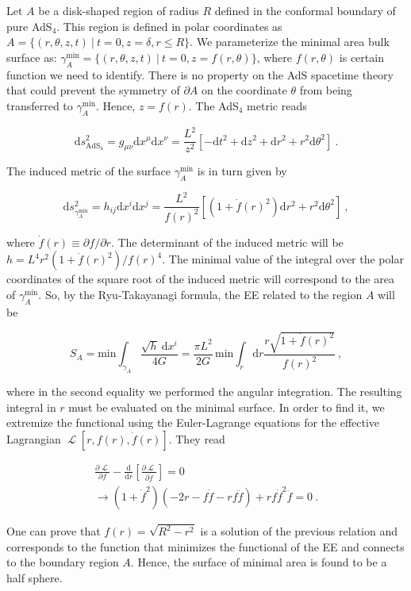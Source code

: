 \documentclass[twocolumn]{revtex4}
\providecommand{\eq}[2]{
    \begin{equation}
        #2
    \label{eq:#1}
    \end{equation}
}
\providecommand{\eqgat}[2]{
    \begin{gather}
        #2
    \label{eq:#1}
    \end{gather}
}
\DeclareMathOperator{\calL}{\mathcal{L}}
\begin{document}
Let $A$ be a disk-shaped region of radius $R$ defined in the conformal boundary of pure AdS$_4$. This region is defined in polar coordinates as
$
    A = \{ ( r, \theta, z, t ) \ | \ t = 0, z = \delta, r \le R \} 
$. 
We parameterize the minimal area bulk surface as:
$
    \gamma_A^\text{min} = \{ ( r, \theta, z, t ) \ | \ t = 0, z = f (r, \theta) \} %
$, 
where $f(r,\theta)$ is certain function we need to identify. There is no property on the AdS spacetime theory that could prevent the symmetry of $\partial A$ on the coordinate $\theta$ from being transferred to $\gamma_A^\text{min}$. Hence, $z=f(r)$.
The AdS$_4$ metric reads
\eq{1Ametric}{
    \mathrm{d}s^2_{\text{AdS}_4} = g_{\mu \nu} \mathrm{d}x^\mu \mathrm{d}x^\nu = 
    \frac{L^2}{z^2} [ -\mathrm{d}t^2 + \mathrm{d}z^2 + \mathrm{d}r^2 + r^2 \mathrm{d}\theta^2 ] \ . \nonumber
}
The induced metric of the surface $\gamma_A^\text{min}$ is in turn given by
\eq{1gammaAmetric}{
    \mathrm{d}s^2_{\gamma_A^\text{min}} = h_{i j} \mathrm{d}x^i \mathrm{d}x^j = 
    \frac{L^2}{f(r)^2} \left[ \left( 1+ \dot{f}(r)^2 \right) \mathrm{d}r^2 + r^2 \mathrm{d}\theta^2 \right] \ , \nonumber
}
where $ \dot{f}(r) \equiv \partial f/\partial r$. The determinant of the induced metric will be
$
    h = L^4 r^2 ( 1 + \dot{f}(r)^2 )/f(r)^4 
$.  
The minimal value of the integral over the polar coordinates of the square root of the induced metric will correspond to the area of $\gamma_A^\text{min}$. So, by the Ryu-Takayanagi formula, the EE related to the region $A$ will be
\eq{1EEA}{
    S_A = \text{min} \int_{\gamma_A}    \frac{\sqrt{h} \ \mathrm{d}x^i}{4G} = \frac{\pi L^2}{2G} \, \text{min} \int_r \mathrm{d}r \frac{r \sqrt{ 1 + \dot{f}(r)^2 }}{f(r)^2}  \ ,\nonumber
}
where in the second equality we performed the angular integration. The resulting integral in $r$ must be evaluated on the minimal surface. In order to find it, we extremize the functional using the 
Euler-Lagrange equations for the effective Lagrangian $\calL [r,f(r),\dot{f}(r)]$. They read
\eqgat{1EL}{
    \frac{\partial \calL}{\partial f} - \frac{\mathrm{d}}{\mathrm{d}r} \left[ \frac{\partial \calL}{\partial \dot{f}} \right] = 0 \nonumber \\
    \longrightarrow \left( 1+\dot{f}^2 \right) \left( -2r-f\dot{f}-rf\ddot{f} \right) + rf\dot{f}^2\ddot{f} = 0 \ .\nonumber
}
One can prove that $f(r) = \sqrt{R^2 - r^2}$ is a solution of the previous relation and corresponds to the function that minimizes the functional of the EE and connects to the boundary region $A$. Hence, the surface of minimal area is found to be a half sphere.
\end{document}
